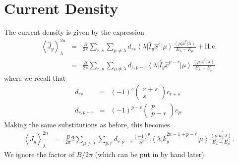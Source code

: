 \documentclass[a4paper, 10pt]{paper}
\newcommand{\be}{\begin{eqnarray*}}
\newcommand{\ee}{\end{eqnarray*}}
\newcommand{\ket}[1]{\left|{#1}\right\rangle}
\newcommand{\bra}[1]{\left\langle{#1}\right|}
\newcommand{\hc}{\mathrm{H.c.}}
\begin{document}
\section{Current Density}
The current density is given by the expression
\be
\left\langle \hat{J}_y\right\rangle^{2n}_{\lambda}&=&\frac{B}{2\pi}\sum_{r,s}\sum_{\mu\neq\lambda}d_{rs}\bra{\lambda}\hat{I}_y\hat{x}^s\ket{\mu}\frac{\bra{\mu}\hat{x}^r\ket{\lambda}}{E_\lambda-E_\mu}+\hc\\
&=&\frac{B}{2\pi}\sum_{r,p}\sum_{\mu\neq\lambda}d_{r,p-r}\bra{\lambda}\hat{I}_y\hat{x}^{p-r}\ket{\mu}\frac{\bra{\mu}\hat{x}^r\ket{\lambda}}{E_\lambda-E_\mu}
\ee
where we recall that
\be
d_{rs}&=&(-1)^s\left(\begin{array}{c}
r+s\\
s
\end{array}\right)c_{r+s}\\
d_{r,p-r}&=&(-1)^{p-r}\left(\begin{array}{c}
p\\
p-r
\end{array}\right)c_{p}.
\ee
Making the same substitutions as before, this becomes
\be
\left\langle \hat{J}_y\right\rangle^{2n}_{\lambda}&=&\frac{B}{2\pi}2\sum_{\mu\neq\lambda}\sum_{p,r}d_{r,p-r}\frac{(-1)^p}{B^p}\bra{\lambda}\hat{k}_y^{2n-1+p-r}\ket{\mu}\frac{\bra{\mu}\hat{k}_y^r\ket{\lambda}}{E_\lambda-E_\mu}.
\ee
We ignore the factor of $B/2\pi$ (which can be put in by hand later). 
\end{document}
